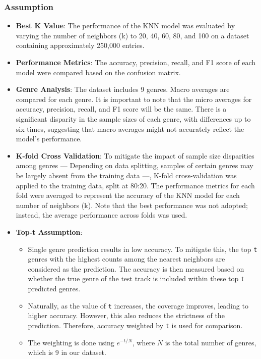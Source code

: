 \documentclass[times, twocolumn]{article}
\begin{document}
\subsubsection{Assumption}
\begin{itemize}
    \item \textbf{Best K Value}: The performance of the KNN model was evaluated by varying the number of neighbors (k) to 20, 40, 60, 80, and 100 on a dataset containing approximately 250,000 entries.
    \item \textbf{Performance Metrics}: The accuracy, precision, recall, and F1 score of each model were compared based on the confusion matrix.
    \item \textbf{Genre Analysis}: The dataset includes 9 genres. Macro averages are compared for each genre. It is important to note that the micro averages for accuracy, precision, recall, and F1 score will be the same. There is a significant disparity in the sample sizes of each genre, with differences up to six times, suggesting that macro averages might not accurately reflect the model's performance.
    \item \textbf{K-fold Cross Validation}: To mitigate the impact of sample size disparities among genres --- Depending on data splitting, samples of certain genres may be largely absent from the training data ---, K-fold cross-validation was applied to the training data, split at 80:20. The performance metrics for each fold were averaged to represent the accuracy of the KNN model for each number of neighbors (k). Note that the best performance was not adopted; instead, the average performance across folds was used.
    \item \textbf{Top-t Assumption}:
    \begin{itemize}
        \item Single genre prediction results in low accuracy. To mitigate this, the top \verb|t| genres with the highest counts among the nearest neighbors are considered as the prediction. The accuracy is then measured based on whether the true genre of the test track is included within these top \verb|t| predicted genres.
        \item Naturally, as the value of \verb|t| increases, the coverage improves, leading to higher accuracy. However, this also reduces the strictness of the prediction. Therefore, accuracy weighted by \verb|t| is used for comparison.
        \item The weighting is done using $e^{-t/N}$, where $N$ is the total number of genres, which is 9 in our dataset.
    \end{itemize}
\end{itemize}
\end{document}
